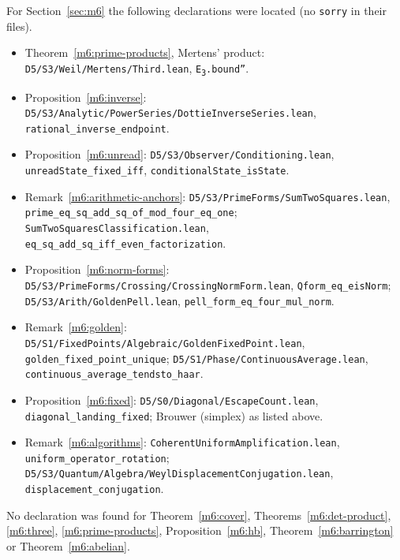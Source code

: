 \documentclass[11pt,reqno]{amsart}
\theoremstyle{definition}
\theoremstyle{remark}
\numberwithin{equation}{section}
\begin{document}
For Section~\ref{sec:m6} the following declarations were located (no \texttt{sorry} in their files).
{\small\raggedright
\begin{itemize}[leftmargin=1.5em]
\item Theorem~\ref{m6:prime-products}, Mertens' product: \texttt{D5/S3/Weil/Mertens/Third.lean}, \texttt{E\textsubscript{3}.bound''}.
\item Proposition~\ref{m6:inverse}: \texttt{D5/S3/Analytic/PowerSeries/DottieInverseSeries.lean}, \texttt{rational\_inverse\_endpoint}.
\item Proposition~\ref{m6:unread}: \texttt{D5/S3/Observer/Conditioning.lean}, \texttt{unreadState\_fixed\_iff}, \texttt{conditionalState\_isState}.
\item Remark~\ref{m6:arithmetic-anchors}: \texttt{D5/S3/PrimeForms/SumTwoSquares.lean}, \texttt{prime\_eq\_sq\_add\_sq\_of\_mod\_four\_eq\_one};
\texttt{SumTwoSquaresClassification.lean}, \texttt{eq\_sq\_add\_sq\_iff\_even\_factorization}.
\item Proposition~\ref{m6:norm-forms}: \texttt{D5/S3/PrimeForms/Crossing/CrossingNormForm.lean}, \texttt{Qform\_eq\_eisNorm};
\texttt{D5/S3/Arith/GoldenPell.lean}, \texttt{pell\_form\_eq\_four\_mul\_norm}.
\item Remark~\ref{m6:golden}: \texttt{D5/S1/FixedPoints/Algebraic/GoldenFixedPoint.lean}, \texttt{golden\_fixed\_point\_unique};
\texttt{D5/S1/Phase/ContinuousAverage.lean}, \texttt{continuous\_average\_tendsto\_haar}.
\item Proposition~\ref{m6:fixed}: \texttt{D5/S0/Diagonal/EscapeCount.lean}, \texttt{diagonal\_landing\_fixed}; Brouwer (simplex) as listed above.
\item Remark~\ref{m6:algorithms}: \texttt{CoherentUniformAmplification.lean}, \texttt{uniform\_operator\_rotation};
\texttt{D5/S3/Quantum/Algebra/WeylDisplacementConjugation.lean}, \texttt{displacement\_conjugation}.
\end{itemize}}
No declaration was found for Theorem~\ref{m6:cover}, Theorems~\ref{m6:det-product}, \ref{m6:three}, \ref{m6:prime-products},
Proposition~\ref{m6:hb}, Theorem~\ref{m6:barrington} or Theorem~\ref{m6:abelian}.
\end{document}
